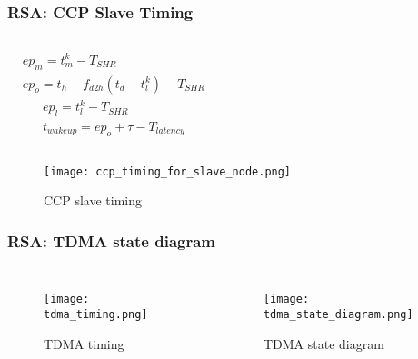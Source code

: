 \documentclass[10pt]{beamer}
\begin{document}
\begin{frame}
    \frametitle{RSA: CCP Slave Timing}
    \begin{columns}
        \begin{equation*}
            \begin{split}
                & ep_m = t^k_m - T_{SHR}\\
                & ep_o = t_h - f_{d2h}(t_d - t^k_l) - T_{SHR}
            \end{split}
        \end{equation*}
        \begin{equation*}
            \begin{split}
                & ep_l = t^k_l - T_{SHR} \\
                & t_{wake up} = ep_o + \tau - T_{latency}
            \end{split}
        \end{equation*}
    \end{columns}
    \begin{figure}[H]
        \begin{center}
            \texttt{[image: ccp\_timing\_for\_slave\_node.png]}
        \end{center}
        \caption{CCP slave timing}
        \label{fig:ccp_timing_for_slave_node}
    \end{figure}
\end{frame}

\begin{frame}
    \frametitle{RSA: TDMA state diagram}
    \begin{columns}
        \begin{figure}[H]
            \begin{center}
                \texttt{[image: tdma\_timing.png]}
            \end{center}
            \caption{TDMA timing}
            \label{fig:tdma_timing}
        \end{figure}
        \begin{figure}[H]
            \begin{center}
                \texttt{[image: tdma\_state\_diagram.png]}
            \end{center}
            \caption{TDMA state diagram}
            \label{fig:tdma_state_diagram}
        \end{figure}
    \end{columns}
\end{frame}
\end{document}

